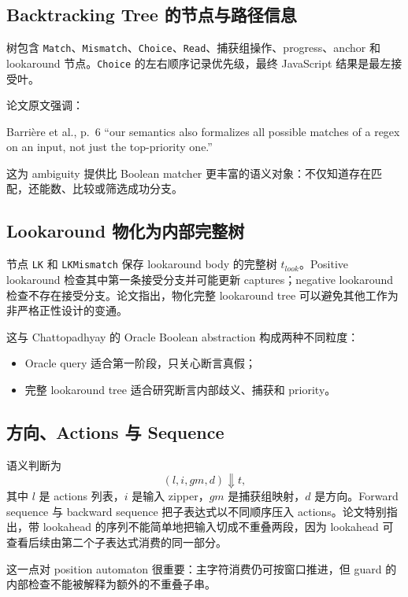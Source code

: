\documentclass[UTF8,a4paper,12pt]{ctexart}
\begin{document}
\subsection{Backtracking Tree 的节点与路径信息}

树包含 \texttt{Match}、\texttt{Mismatch}、\texttt{Choice}、\texttt{Read}、捕获组操作、progress、anchor 和 lookaround 节点。\texttt{Choice} 的左右顺序记录优先级，最终 JavaScript 结果是最左接受叶。

论文原文强调：
\begin{paperquote}{Barri\`ere et al., p.~6}
``our semantics also formalizes all possible matches of a regex on an input, not just the top-priority one.''
\end{paperquote}
这为 ambiguity 提供比 Boolean matcher 更丰富的语义对象：不仅知道存在匹配，还能数、比较或筛选成功分支。

\subsection{Lookaround 物化为内部完整树}

节点 \texttt{LK} 和 \texttt{LKMismatch} 保存 lookaround body 的完整树 $t_{look}$。Positive lookaround 检查其中第一条接受分支并可能更新 captures；negative lookaround 检查不存在接受分支。论文指出，物化完整 lookaround tree 可以避免其他工作为非严格正性设计的变通\cite[pp.~5--8]{barriere2026}。

这与 Chattopadhyay 的 Oracle Boolean abstraction 构成两种不同粒度：
\begin{itemize}
  \item Oracle query 适合第一阶段，只关心断言真假；
  \item 完整 lookaround tree 适合研究断言内部歧义、捕获和 priority。
\end{itemize}

\subsection{方向、Actions 与 Sequence}

语义判断为
\[
(l,i,gm,d)\Downarrow t,
\]
其中 $l$ 是 actions 列表，$i$ 是输入 zipper，$gm$ 是捕获组映射，$d$ 是方向。Forward sequence 与 backward sequence 把子表达式以不同顺序压入 actions。论文特别指出，带 lookahead 的序列不能简单地把输入切成不重叠两段，因为 lookahead 可查看后续由第二个子表达式消费的同一部分\cite[p.~8]{barriere2026}。

这一点对 position automaton 很重要：主字符消费仍可按窗口推进，但 guard 的内部检查不能被解释为额外的不重叠子串。
\end{document}

